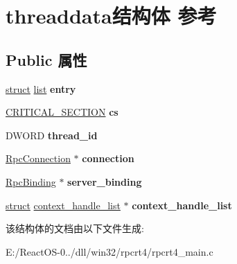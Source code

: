 \hypertarget{structthreaddata}{}\section{threaddata结构体 参考}
\label{structthreaddata}
\subsection*{Public 属性}
\begin{DoxyCompactItemize}
\item 
\mbox{\label{structthreaddata_a49e737d718f660e2d57ddf4c185111cb}} 
\hyperlink{interfacestruct}{struct} \hyperlink{classlist}{list} {\bfseries entry}
\item 
\mbox{\label{structthreaddata_ae52d0d190b7d571c157ed95f473359bd}} 
\hyperlink{struct___c_r_i_t_i_c_a_l___s_e_c_t_i_o_n}{C\+R\+I\+T\+I\+C\+A\+L\+\_\+\+S\+E\+C\+T\+I\+ON} {\bfseries cs}
\item 
\mbox{\label{structthreaddata_a78c7b857a23c3c5a9d1a27ec689605cc}} 
D\+W\+O\+RD {\bfseries thread\+\_\+id}
\item 
\mbox{\label{structthreaddata_a86a530e654d850dba398b83ea1a4df78}} 
\hyperlink{struct___rpc_connection}{Rpc\+Connection} $\ast$ {\bfseries connection}
\item 
\mbox{\label{structthreaddata_a32e4cedd689a94e92982afd6c89ec8ef}} 
\hyperlink{struct___rpc_binding}{Rpc\+Binding} $\ast$ {\bfseries server\+\_\+binding}
\item 
\mbox{\label{structthreaddata_a4f25bfb8e823c2a946f25c2622609c29}} 
\hyperlink{interfacestruct}{struct} \hyperlink{structcontext__handle__list}{context\+\_\+handle\+\_\+list} $\ast$ {\bfseries context\+\_\+handle\+\_\+list}
\end{DoxyCompactItemize}


该结构体的文档由以下文件生成\+:\begin{DoxyCompactItemize}
\item 
E\+:/\+React\+O\+S-\/0../dll/win32/rpcrt4/rpcrt4\+\_\+main.\+c\end{DoxyCompactItemize}
